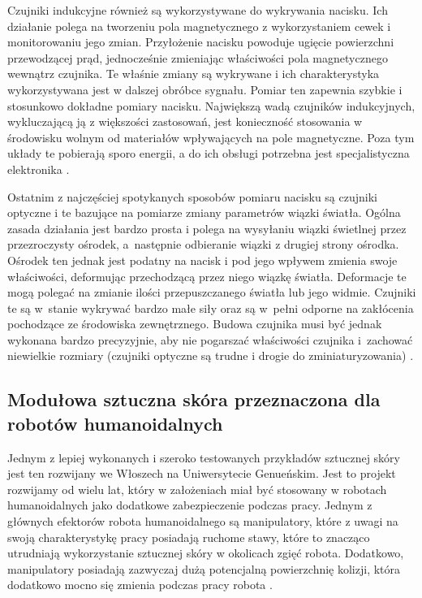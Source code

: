 Czujniki indukcyjne również są wykorzystywane do wykrywania nacisku. Ich działanie polega na tworzeniu pola magnetycznego z wykorzystaniem cewek i monitorowaniu jego zmian. Przyłożenie nacisku powoduje ugięcie powierzchni przewodzącej prąd, jednocześnie zmieniając właściwości pola magnetycznego wewnątrz czujnika. Te właśnie zmiany są wykrywane i ich charakterystyka wykorzystywana jest w dalszej obróbce sygnału. Pomiar ten zapewnia szybkie i stosunkowo dokładne pomiary nacisku. Największą wadą czujników indukcyjnych, wykluczającą ją z większości zastosowań, jest konieczność stosowania w środowisku wolnym od materiałów wpływających na pole magnetyczne. Poza tym układy te pobierają sporo energii, a do ich obsługi potrzebna jest specjalistyczna elektronika \cite{b_article_tactile_inductive, b_article_reviev_tactile_skin}.

Ostatnim z najczęściej spotykanych sposobów pomiaru nacisku są czujniki optyczne i te bazujące na pomiarze zmiany parametrów wiązki światła. Ogólna zasada działania jest bardzo prosta i polega na wysyłaniu wiązki świetlnej przez przezroczysty ośrodek, a~następnie odbieranie wiązki z drugiej strony ośrodka. Ośrodek ten jednak jest podatny na nacisk i pod jego wpływem zmienia swoje właściwości, deformując przechodzącą przez niego wiązkę światła. Deformacje te mogą polegać na zmianie ilości przepuszczanego światła lub jego widmie. Czujniki te są w~stanie wykrywać bardzo małe siły oraz są w~pełni odporne na zakłócenia pochodzące ze środowiska zewnętrznego.
Budowa czujnika musi być jednak wykonana bardzo precyzyjnie, aby nie pogarszać właściwości czujnika i~zachować niewielkie rozmiary (czujniki optyczne są trudne i drogie do zminiaturyzowania) \cite{b_konf_tactile_opto, b_article_reviev_tactile_skin, b_article_reviev_2_tactile_skin}.


\subsection{Modułowa sztuczna skóra przeznaczona dla robotów humanoidalnych}


Jednym z lepiej wykonanych i szeroko testowanych przykładów sztucznej skóry jest ten rozwijany we Włoszech na Uniwersytecie Genueńskim. Jest to projekt rozwijamy od wielu lat, który w założeniach miał być stosowany w robotach humanoidalnych jako dodatkowe zabezpieczenie podczas pracy. Jednym z głównych efektorów robota humanoidalnego są manipulatory, które z uwagi na swoją charakterystykę pracy posiadają ruchome stawy, które to znacząco utrudniają wykorzystanie sztucznej skóry w okolicach zgięć robota. Dodatkowo, manipulatory posiadają zazwyczaj dużą potencjalną powierzchnię kolizji, która dodatkowo mocno się zmienia podczas pracy robota \cite{b_konf_wloch_1_opis_budowy}. 

